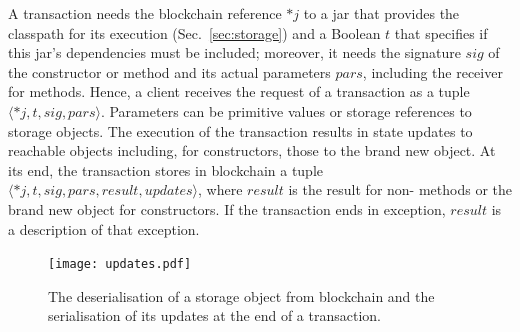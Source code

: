 \documentclass[10pt]{llncs}
\def\codesize{}
\def\<#1>{\codeid{#1}}
\newcommand{\codeid}[1]{\ifmmode{\mbox{\codesize\ttfamily{#1}}}\else{\codesize\ttfamily #1}\fi}
\begin{document}
A transaction needs the blockchain reference $*j$ to a jar that
provides the classpath for its execution
(Sec.~\ref{sec:storage}) and a Boolean $t$ that specifies
if this jar's dependencies must be included; moreover,
it needs the signature $\mathit{sig}$ of the constructor or method
and its actual parameters $\mathit{pars}$, including the receiver for methods.
Hence, a client receives the request of a transaction as a tuple
$\langle *j,t,\mathit{sig},\mathit{pars}\rangle$.
Parameters can be primitive values
or storage references to storage objects.
The execution of the transaction results
in state updates to reachable objects
including, for constructors, those to the brand new object.
At its end, the transaction stores in blockchain a tuple
$\langle *j,t,\mathit{sig},\mathit{pars},\mathit{result},\mathit{updates}\rangle$,
where $\mathit{result}$ is the result for non-\<void> methods or the brand new object
for constructors. If the transaction ends in exception,
$\mathit{result}$ is a description of that exception.

\begin{figure}[t]
  \texttt{[image: updates.pdf]}
  \caption{The deserialisation of a storage object from blockchain and the serialisation
    of its updates at the end of a transaction.}
  \label{fig:transaction}
\end{figure}
\end{document}
